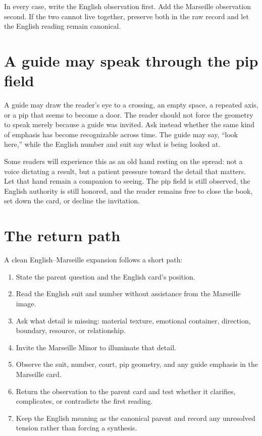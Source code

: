 In every case, write the English observation first. Add the Marseille
observation second. If the two cannot live together, preserve both in the raw
record and let the English reading remain canonical.

\section{A guide may speak through the pip field}

A guide may draw the reader's eye to a crossing, an empty space, a repeated
axis, or a pip that seems to become a door. The reader should not force the
geometry to speak merely because a guide was invited. Ask instead whether the
same kind of emphasis has become recognizable across time. The guide may say,
``look here,'' while the English number and suit say what is being looked at.

Some readers will experience this as an old hand resting on the spread: not a
voice dictating a result, but a patient pressure toward the detail that matters.
Let that hand remain a companion to seeing. The pip field is still observed,
the English authority is still honored, and the reader remains free to close the
book, set down the card, or decline the invitation.

\section{The return path}

A clean English--Marseille expansion follows a short path:

\begin{enumerate}
\item State the parent question and the English card's position.
\item Read the English suit and number without assistance from the Marseille
      image.
\item Ask what detail is missing: material texture, emotional container,
      direction, boundary, resource, or relationship.
\item Invite the Marseille Minor to illuminate that detail.
\item Observe the suit, number, court, pip geometry, and any guide emphasis in
      the Marseille card.
\item Return the observation to the parent card and test whether it clarifies,
      complicates, or contradicts the first reading.
\item Keep the English meaning as the canonical parent and record any unresolved
      tension rather than forcing a synthesis.
\end{enumerate}

